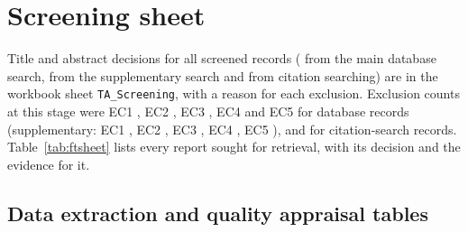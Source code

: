 \clearpage
\section{Screening sheet}
Title and abstract decisions for all \totalScreened{} screened records (\taScreened{} from the main database search, \spScreened{} from the supplementary search and \csScreened{} from citation searching) are in the workbook sheet \texttt{TA\_Screening}, with a reason for each exclusion. Exclusion counts at this stage were EC1 \dbAllExOne, EC2 \dbAllExTwo, EC3 \dbAllExThree, EC4 \dbAllExFour{} and EC5 \dbAllExFive{} for database records (supplementary: EC1 \spExOne, EC2 \spExTwo, EC3 \spExThree, EC4 \spExFour, EC5 \spExFive), and \csTaExcluded{} for citation-search records. Table~\ref{tab:ftsheet} lists every report sought for retrieval, with its decision and the evidence for it.
{\scriptsize\setlength{\tabcolsep}{2pt}}

\clearpage
\begin{landscape}
\section{Data extraction and quality appraisal tables}
{\scriptsize\setlength{\tabcolsep}{3pt}}
\clearpage
{\scriptsize\setlength{\tabcolsep}{2.5pt}}
\end{landscape}

\clearpage
